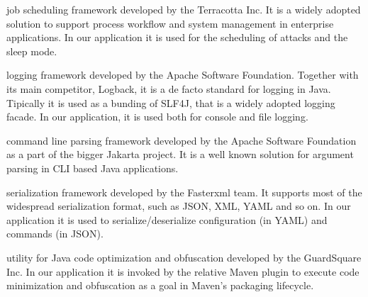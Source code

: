 \begin{description}
  \setlength\itemsep{1em}
  \item[QUARTZ] job scheduling framework developed by the Terracotta Inc.
  It is a widely adopted solution to support process workflow and system management in enterprise applications.
  In our application it is used for the scheduling of attacks and the sleep mode.

  \item[LOG4J2] logging framework developed by the Apache Software Foundation.
  Together with its main competitor, Logback, it is a de facto standard for logging in Java. Tipically it is used as a bunding of SLF4J, that is a widely adopted logging facade.
  In our application, it is used both for console and file logging.

  \item[COMMONS CLI] command line parsing framework developed by the Apache Software Foundation as a part of the bigger Jakarta project.
  It is a well known solution for argument parsing in CLI based Java applications.

  \item[JACKSON] serialization framework developed by the Fasterxml team.
  It supports most of the widespread serialization format, such as JSON, XML, YAML and so on.
  In our application it is used to serialize/deserialize configuration (in YAML) and commands (in JSON).

  \item[PROGUARD] utility for Java code optimization and obfuscation developed by the GuardSquare Inc.
  In our application it is invoked by the relative Maven plugin to execute code minimization and obfuscation as a goal in Maven's packaging lifecycle.

\end{description}
